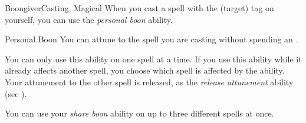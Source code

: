 \begin{feat}{Boongiver}{Casting, Magical}
         When you cast a spell with the  (target) tag on yourself, you can use the \textit{personal boon} ability.
        \begin{freeability}{Personal Boon}
            You can attune to the spell you are casting without spending an .

            You can only use this ability on one spell at a time.
            If you use this ability while it already affects another spell, you choose which spell is affected by the ability.
            Your attunement to the other spell is released, as the \textit{release attunement} ability (see ).
        \end{freeability}

         You can use your \textit{share boon} ability on up to three different spells at once.
    \end{feat}

